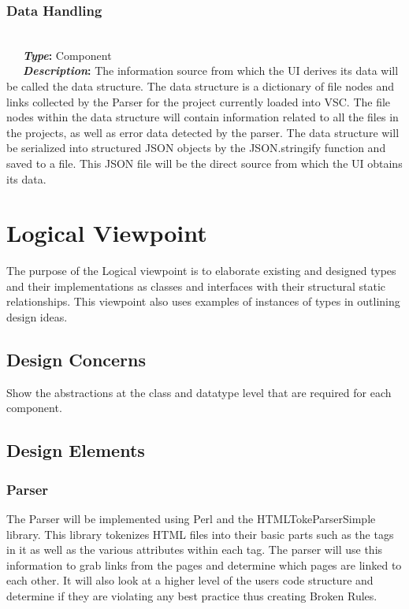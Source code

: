 \documentclass[letterpaper,10pt,titlepage,draftclsnofoot,onecolumn,onesided] {IEEEtran}
\newcommand{\bolditin}[2]{
	\-\ \-\ \-\ \textbf{\textit{#1}#2}
}
\begin{document}
\subsubsection{Data Handling} 
\hfill \\
\bolditin{Type}{:} Component \\
\bolditin{Description}{:} The information source from which the UI derives its data will be called the data structure. 
The data structure is a dictionary of file nodes and links collected by the Parser for the project currently loaded into VSC. 
The file nodes within the data structure will contain information related to all the files in the projects, as well as error data detected by the parser.
The data structure will be serialized into structured JSON objects by the JSON.stringify function and saved to a file. \cite{stringify}
This JSON file will be the direct source from which the UI obtains its data.

	
	
\section{Logical Viewpoint}
The purpose of the Logical viewpoint is to elaborate existing and designed types and their implementations
as classes and interfaces with their structural static relationships. This viewpoint also uses examples of
instances of types in outlining design ideas. 
\subsection{Design Concerns}
Show the abstractions at the class and datatype level that are required for each component. 
\subsection{Design Elements}

\subsubsection{Parser}
The Parser will be implemented using Perl and the HTMLTokeParserSimple library\cite{htmltokeparser}.
This library tokenizes HTML files into their basic parts such as the tags in it as well as the various attributes within each tag.
The parser will use this information to grab links from the pages and determine which pages are linked to each other.
It will also look at a higher level of the users code structure and determine if they are violating any best practice thus creating Broken Rules. 
\end{document}
